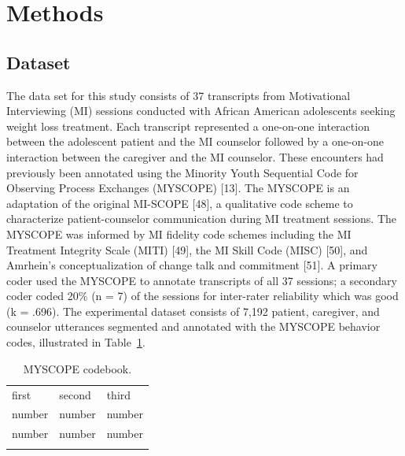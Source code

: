 \section{Methods}
\label{sec:methods}
\subsection{Dataset}
\label{subsec:dataset}
The data set for this study consists of 37 transcripts from Motivational Interviewing (MI) sessions conducted with African American adolescents seeking weight loss treatment. Each transcript represented a one-on-one interaction between the adolescent patient and the MI counselor followed by a one-on-one interaction between the caregiver and the MI counselor. These encounters had previously been annotated using the Minority Youth Sequential Code for Observing Process Exchanges (MYSCOPE) [13]. The MYSCOPE is an adaptation of the original MI-SCOPE [48], a qualitative code scheme to characterize patient-counselor communication during MI treatment sessions. The MYSCOPE was informed by MI fidelity code schemes including the MI Treatment Integrity Scale (MITI) [49], the MI Skill Code (MISC) [50], and Amrhein’s conceptualization of change talk and commitment [51]. A primary coder used the MYSCOPE to annotate transcripts of all 37 sessions; a secondary coder coded 20\% (n = 7) of the sessions for inter-rater reliability which was good (k = .696). The experimental dataset consists of 7,192 patient, caregiver, and counselor utterances segmented and annotated with the MYSCOPE behavior codes, illustrated in Table~\ref{tab:codebook}.

\begin{table}
\caption{MYSCOPE codebook.}
\label{tab:codebook}       %
\begin{tabular}{lll}
\hline\noalign{\smallskip}
first & second & third  \\
\noalign{\smallskip}\hline\noalign{\smallskip}
number & number & number \\
number & number & number \\
\noalign{\smallskip}\hline
\end{tabular}
\end{table}

